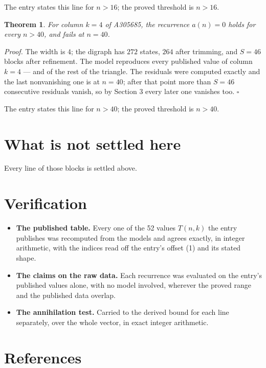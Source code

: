 \documentclass[11pt]{article}
\newtheorem{theorem}{Theorem}
\theoremstyle{definition}
\begin{document}
The entry states this line for $n > 16$; the proved threshold is $n > 16$.

\begin{theorem} For column $k = 4$ of A305685, the recurrence $a(n) = 0$ holds for every $n > 40$, and fails at $n = 40$.\end{theorem}

{\itshape Proof.} The width is $4$; the digraph has $272$ states, $264$ after trimming, and $S = 46$ blocks after refinement. The model reproduces every published value of column $k = 4$ --- and of the rest of the triangle. The residuals were computed exactly and the last nonvanishing one is at $n = 40$; after that point more than $S = 46$ consecutive residuals vanish, so by Section 3 every later one vanishes too. $\square$

The entry states this line for $n > 40$; the proved threshold is $n > 40$.

\section{What is not settled here}

Every line of those blocks is settled above.

\section{Verification}

\begin{itemize}

\item {\bfseries The published table.} Every one of the 52 values $T(n,k)$ the entry publishes was recomputed from the models and agrees exactly, in integer arithmetic, with the indices read off the entry's offset (1) and its stated shape.

\item {\bfseries The claims on the raw data.} Each recurrence was evaluated on the entry's published values alone, with no model involved, wherever the proved range and the published data overlap.

\item {\bfseries The annihilation test.} Carried to the derived bound for each line separately, over the whole vector, in exact integer arithmetic.

\end{itemize}

\section{References}
\end{document}
